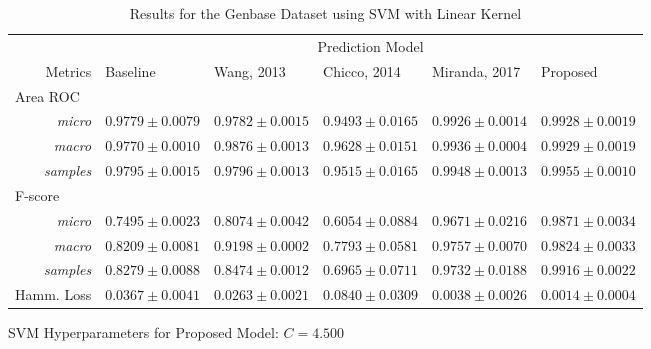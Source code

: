 \begin{table}[!ht]
    \footnotesize
    \centering
    \caption{Results for the Genbase Dataset using SVM with Linear Kernel}
    \label{results:genbase_lsvm}
    \begin{threeparttable}
        \begin{tabular}{@{}rrlllll@{}}
        \toprule
    && \multicolumn{5}{c}{Prediction Model} \\ \cmidrule{3-7}
    \multicolumn{2}{r}{Metrics}               & Baseline                & Wang, 2013 & Chicco, 2014 & Miranda, 2017 & Proposed            \\ \midrule
\multicolumn{2}{l}{Area ROC} \\
                   & \textit{micro}       & $0.9779 \pm 0.0079$ & $0.9782 \pm 0.0015$ & $0.9493 \pm 0.0165$ & $0.9926 \pm 0.0014$ & $\mathbf{0.9928 \pm 0.0019}$ \\
                    & \textit{macro}       & $0.9770 \pm 0.0010$ & $0.9876 \pm 0.0013$ & $0.9628 \pm 0.0151$ & $\mathbf{0.9936 \pm 0.0004}$ & $0.9929 \pm 0.0019$ \\
                    & \textit{samples}       & $0.9795 \pm 0.0015$ & $0.9796 \pm 0.0013$ & $0.9515 \pm 0.0165$ & $0.9948 \pm 0.0013$ & $\mathbf{0.9955 \pm 0.0010}$ \\
\multicolumn{2}{l}{F-score} \\
                   & \textit{micro}       & $0.7495 \pm 0.0023$ & $0.8074 \pm 0.0042$ & $0.6054 \pm 0.0884$ & $0.9671 \pm 0.0216$ & $\mathbf{0.9871 \pm 0.0034}$ \\
                    & \textit{macro}       & $0.8209 \pm 0.0081$ & $0.9198 \pm 0.0002$ & $0.7793 \pm 0.0581$ & $0.9757 \pm 0.0070$ & $\mathbf{0.9824 \pm 0.0033}$ \\
                    & \textit{samples}       & $0.8279 \pm 0.0088$ & $0.8474 \pm 0.0012$ & $0.6965 \pm 0.0711$ & $0.9732 \pm 0.0188$ & $\mathbf{0.9916 \pm 0.0022}$ \\ 
\multicolumn{2}{l}{Hamm. Loss}                & $0.0367 \pm 0.0041$ & $0.0263
\pm 0.0021$ & $0.0840 \pm 0.0309$ & $0.0038 \pm 0.0026$ & $\mathbf{0.0014 \pm
0.0004}$ \\ \bottomrule
        \end{tabular}
        \begin{tablenotes}
                \item SVM Hyperparameters for Proposed Model: $C=4.500$
        \end{tablenotes}
    \end{threeparttable}
    \end{table}
